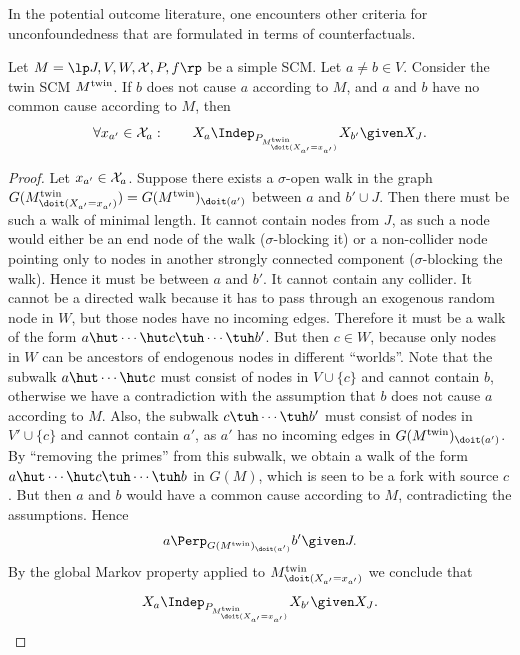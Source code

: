In the potential outcome literature, one encounters other criteria for unconfoundedness that are formulated in terms 
of counterfactuals.
\begin{Prp}\label{prp:potential_outcome_unconfoundedness}
Let $M = \lt \Sin, \Send, \Srnd, \CX, P, f \rt$ be a simple SCM.
Let $a \ne b \in V$. Consider the twin SCM $M^{\mathrm{twin}}$. 
If $b$ does not cause $a$ according to $M$, and $a$ and $b$ have no common cause according to $M$, then
  \begin{equation}\label{eq:potential_outcome_unconfoundedness}
    \forall x_{a'} \in \CX_a: \qquad X_a \Indep_{P_{M^\twin_{\doit(X_{a'}=x_{a'})}}} X_{b'} \given X_J.
  \end{equation}
\end{Prp}
\begin{proof}
  Let $x_{a'} \in \mathcal{X}_a$.
  Suppose there exists a $\sigma$-open walk in the graph $G(M^\twin_{\doit(X_{a'}=x_{a'})}) = G(M^\twin)_{\doit(a')}$
  between $a$ and $b' \cup J$. Then there must be such a walk of minimal length.
  It cannot contain nodes from $J$, as such a node would either be an end node of the walk ($\sigma$-blocking it)
  or a non-collider node pointing only to nodes in another strongly connected component 
  ($\sigma$-blocking the walk).
  Hence it must be between $a$ and $b'$.
  It cannot contain any collider. It cannot be a directed walk
  because it has to pass through an exogenous random node in $W$, but those nodes have no incoming edges. 
  Therefore it must be a walk of the form $a \hut \cdots \hut c \tuh \cdots \tuh b'$.
  But then $c \in W$, because only nodes in $W$ can be ancestors of endogenous nodes in different ``worlds''.
  Note that the subwalk $a \hut \cdots \hut c$ must consist of nodes in $V \cup \{c\}$ and cannot contain $b$, 
  otherwise we have a contradiction with the assumption that $b$ does not cause $a$ according to $M$.
  Also, the subwalk $c \tuh \cdots \tuh b'$ must consist of nodes in $V' \cup \{c\}$ and cannot contain $a'$,
  as $a'$ has no incoming edges in $G(M^\twin)_{\doit(a')}$.
  By ``removing the primes'' from this subwalk, we obtain
  a walk of the form $a \hut \cdots \hut c \tuh \cdots \tuh b$ in $G(M)$, which is seen to be a fork with source $c$. 
  But then $a$ and $b$ would have a common cause according to $M$, contradicting the assumptions.
  Hence 
  $$a \Perp_{G(M^\twin)_{\doit(a')}} b' \given J.$$
  By the global Markov property applied to $M^\twin_{\doit(X_{a'}=x_{a'})}$ we conclude that
  $$X_a \Indep_{P_{M^\twin_{\doit(X_{a'}=x_{a'})}}} X_{b'} \given X_J.$$
\end{proof}
